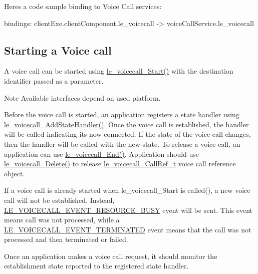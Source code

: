 Here\textquotesingle{}s a code sample binding to Voice Call services\+: \begin{DoxyVerb}bindings:
{
   clientExe.clientComponent.le_voicecall -> voiceCallService.le_voicecall
}
\end{DoxyVerb}
\hypertarget{c_le_voicecall_c_le_voicecall_outgoing}{}\subsection{Starting a Voice call}\label{c_le_voicecall_c_le_voicecall_outgoing}
A voice call can be started using \hyperlink{le__voicecall__interface_8h_aac588cbf58e2ea5655b89b9f6e2fd883}{le\+\_\+voicecall\+\_\+\+Start()} with the destination identifier passed as a parameter.

\begin{DoxyNote}{Note}
Available interfaces depend on used platform.
\end{DoxyNote}
Before the voice call is started, an application registers a state handler using \hyperlink{le__voicecall__interface_8h_a54875833715ef1f81d78d74cb86d0562}{le\+\_\+voicecall\+\_\+\+Add\+State\+Handler()}. Once the voice call is established, the handler will be called indicating it\textquotesingle{}s now connected. If the state of the voice call changes, then the handler will be called with the new state. To release a voice call, an application can use \hyperlink{le__voicecall__interface_8h_aa4758e37f80ef9fd410ef0a9731d3797}{le\+\_\+voicecall\+\_\+\+End()}. Application should use \hyperlink{le__voicecall__interface_8h_adb9eeb5c2e344f72b934dc8b72d3db62}{le\+\_\+voicecall\+\_\+\+Delete()} to release \hyperlink{le__voicecall__interface_8h_a74c8b6a9f13f7a8ef47b6b1d57d8ab56}{le\+\_\+voicecall\+\_\+\+Call\+Ref\+\_\+t} voice call reference object.

If a voice call is already started when le\+\_\+voicecall\+\_\+\+Start is called(), a new voice call will not be established. Instead, \hyperlink{le__voicecall__interface_8h_a51066eb84677e4d4c5447aaf8dd18ff1ad3c8824924d684995308a9e45af95422}{L\+E\+\_\+\+V\+O\+I\+C\+E\+C\+A\+L\+L\+\_\+\+E\+V\+E\+N\+T\+\_\+\+R\+E\+S\+O\+U\+R\+C\+E\+\_\+\+B\+U\+S\+Y} event will be sent. This event means call was not processed, while a \hyperlink{le__voicecall__interface_8h_a51066eb84677e4d4c5447aaf8dd18ff1a55cdfb321f8b09d5037edeb1ec6b04e6}{L\+E\+\_\+\+V\+O\+I\+C\+E\+C\+A\+L\+L\+\_\+\+E\+V\+E\+N\+T\+\_\+\+T\+E\+R\+M\+I\+N\+A\+T\+E\+D} event means that the call was not processed and then terminated or failed.

Once an application makes a voice call request, it should monitor the establishment state reported to the registered state handler.


